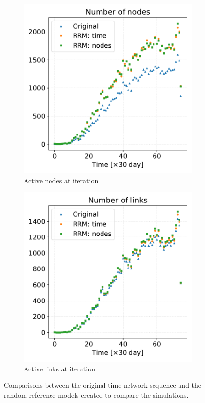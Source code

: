 \documentclass[a4paper,11pt, twocolumn]{article}
\begin{document}
\begin{figure}[H]
\begin{subfigure}[t]{0.24\textwidth}
\centering
\includegraphics[width=\textwidth]{./Figure/Simulations/Number_nodes.pdf}
\caption{Active nodes at iteration}
\end{subfigure}
\begin{subfigure}[t]{0.24\textwidth}
 \centering
\includegraphics[width=\textwidth]{./Figure/Simulations/Number_edges.pdf}
\caption{Active links at iteration}
\end{subfigure}
\caption{Comparisons between the original time network sequence and the random reference models created to compare the simulations.}
\end{figure}
\end{document}
